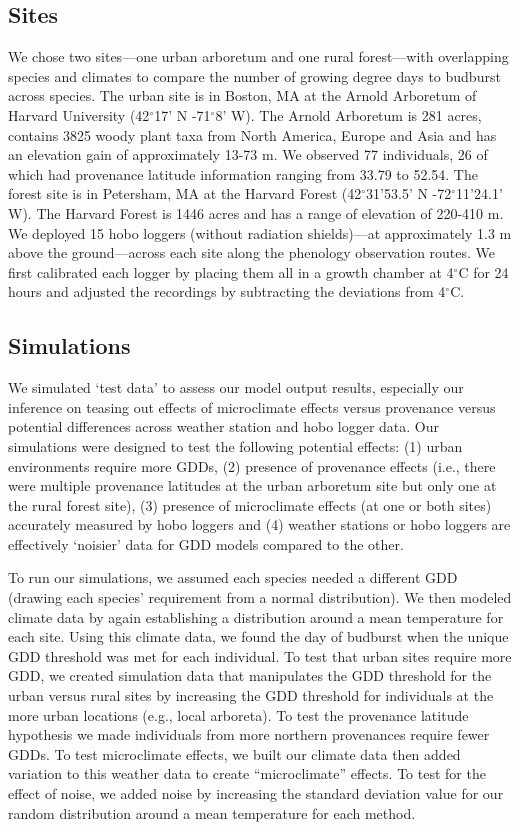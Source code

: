 \documentclass{article}\usepackage[]{graphicx}\usepackage[]{color}
\begin{document}
\subsection*{Sites}
We chose two sites---one urban arboretum and one rural forest---with overlapping species and climates to compare the number of growing degree days to budburst across species. The urban site is in Boston, MA at the Arnold Arboretum of Harvard University (42$^{\circ}$17' N -71$^{\circ}$8' W). The Arnold Arboretum is 281 acres, contains 3825 woody plant taxa from North America, Europe and Asia and has an elevation gain of approximately 13-73 m. We observed 77 individuals, 26 of which had provenance latitude information ranging from 33.79 to 52.54. The forest site is in Petersham, MA at the Harvard Forest (42$^{\circ}$31'53.5' N -72$^{\circ}$11'24.1' W). The Harvard Forest is 1446 acres and has a range of elevation of 220-410 m. We deployed 15 hobo loggers (without radiation shields)---at approximately 1.3 m above the ground---across each site along the phenology observation routes. We first calibrated each logger by placing them all in a growth chamber at 4$^{\circ}$C for 24 hours and adjusted the recordings by subtracting the deviations from 4$^{\circ}$C. %

\subsection*{Simulations}
We simulated `test data' to assess our model output results, especially our inference on teasing out effects of microclimate effects versus provenance versus potential differences across weather station and hobo logger data. Our simulations were designed to test the following potential effects: (1) urban environments require more GDDs, (2) presence of provenance effects (i.e., there were multiple provenance latitudes at the urban arboretum site but only one at the rural forest site), (3) presence of microclimate effects (at one or both sites) accurately measured by hobo loggers and (4) weather stations or hobo loggers are effectively `noisier' data for GDD models compared to the other. 

To run our simulations, we assumed each species needed a different GDD (drawing each species' requirement from a normal distribution). We then modeled climate data by again establishing a distribution around a mean temperature for each site. Using this climate data, we found the day of budburst when the unique GDD threshold was met for each individual. To test that urban sites require more GDD, we created simulation data that manipulates the GDD threshold for the urban versus rural sites by increasing the GDD threshold for individuals at the more urban locations (e.g., local arboreta). To test the provenance latitude hypothesis we made individuals from more northern provenances require fewer GDDs. To test microclimate effects, we built our climate data then added variation to this weather data to create ``microclimate'' effects.  To test for the effect of noise, we added noise by increasing the standard deviation value for our random distribution around a mean temperature for each method.
\end{document}
